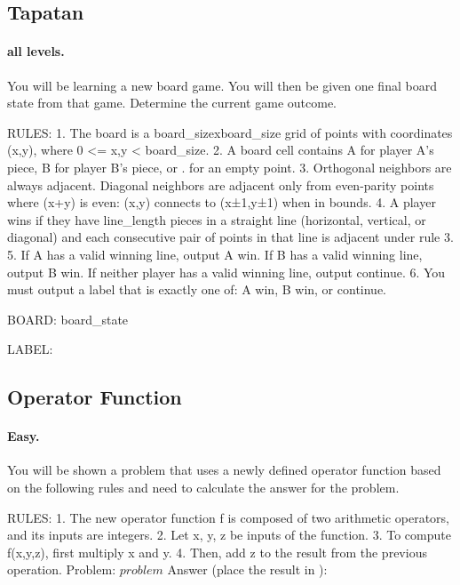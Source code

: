 \subsection*{Tapatan}

\paragraph{all levels.}
\begin{promptbox}
You will be learning a new board game. You will then be given one final board state from that game. Determine the current game outcome.

RULES:
1. The board is a {board_size}x{board_size} grid of points with coordinates (x,y), where 0 <= x,y < {board_size}.
2. A board cell contains A for player A's piece, B for player B's piece, or . for an empty point.
3. Orthogonal neighbors are always adjacent. Diagonal neighbors are adjacent only from even-parity points where (x+y) is even: (x,y) connects to (x±1,y±1) when in bounds.
4. A player wins if they have {line_length} pieces in a straight line (horizontal, vertical, or diagonal) and each consecutive pair of points in that line is adjacent under rule 3.
5. If A has a valid winning line, output A win. If B has a valid winning line, output B win. If neither player has a valid winning line, output continue.
6. You must output a label that is exactly one of: A win, B win, or continue.

BOARD:
{board_state}

LABEL:
\end{promptbox}

\subsection*{Operator Function}

\paragraph{Easy.}
\begin{promptbox}
You will be shown a problem that uses a newly defined operator function based on the following rules and need to calculate the answer for the problem.

RULES:
1. The new operator function f is composed of two arithmetic operators, and its inputs are integers.
2. Let x, y, z be inputs of the function.
3. To compute f(x,y,z), first multiply x and y.
4. Then, add z to the result from the previous operation.
Problem: \({problem}\)
Answer (place the result in \boxed{}):\boxed{}
\end{promptbox}

